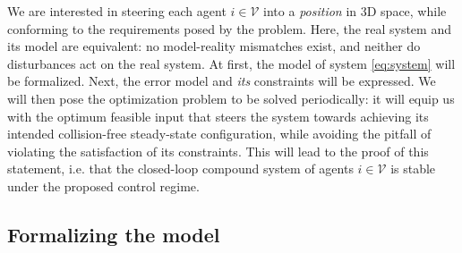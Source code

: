 We are interested in steering each agent $i \in \mathcal{V}$ into
a \textit{position} in 3D space, while conforming to the requirements
posed by the problem. Here, the real system and its model are equivalent:
no model-reality mismatches exist, and neither do disturbances act on the real
system. At first, the model of system \eqref{eq:system} will be formalized.
Next, the error model and \textit{its} constraints will be expressed. We will
then pose the optimization problem to be solved periodically: it will equip us
with the optimum feasible input that steers the system towards achieving
its intended collision-free steady-state configuration, while avoiding the
pitfall of violating the satisfaction of its constraints. This will lead to
the proof of this statement, i.e. that the closed-loop compound system of
agents $i \in \mathcal{V}$ is stable under the proposed control regime.


\subsection{Formalizing the model}

